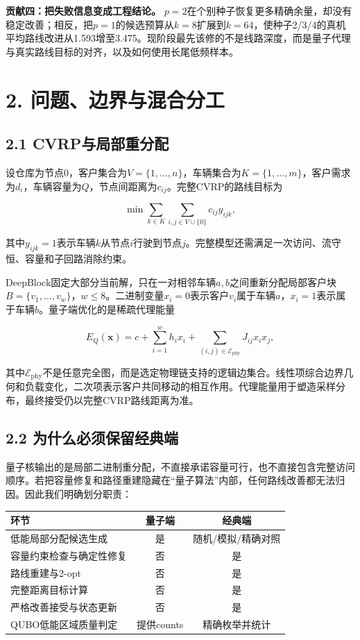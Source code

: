 \documentclass[
  10.5pt,
  UTF8]{ctexart}
\newcounter{none} %
\begin{document}
\textbf{贡献四：把失败信息变成工程结论。} \(p=2\)在个别种子恢复更多精确余量，却没有稳定改善；相反，把\(p=1\)的候选预算从\(k=8\)扩展到\(k=64\)，使种子2/3/4的真机平均路线改进从1.593增至3.475。现阶段最先该修的不是线路深度，而是量子代理与真实路线目标的对齐，以及如何使用长尾低频样本。

\section{2. 问题、边界与混合分工}\label{ux95eeux9898ux8fb9ux754cux4e0eux6df7ux5408ux5206ux5de5}

\subsection{2.1 CVRP与局部重分配}\label{cvrpux4e0eux5c40ux90e8ux91cdux5206ux914d}

设仓库为节点0，客户集合为\(V=\{1,\ldots,n\}\)，车辆集合为\(K=\{1,\ldots,m\}\)，客户需求为\(d_i\)，车辆容量为\(Q\)，节点间距离为\(c_{ij}\)。完整CVRP的路线目标为

\[
\min \sum_{k\in K}\sum_{i,j\in V\cup\{0\}} c_{ij}y_{ijk},
\]

其中\(y_{ijk}=1\)表示车辆\(k\)从节点\(i\)行驶到节点\(j\)。完整模型还需满足一次访问、流守恒、容量和子回路消除约束。

DeepBlock固定大部分当前解，只在一对相邻车辆\(a,b\)之间重新分配局部客户块\(B=\{v_1,\ldots,v_w\}\)，\(w\le 8\)。二进制变量\(x_i=0\)表示客户\(v_i\)属于车辆\(a\)，\(x_i=1\)表示属于车辆\(b\)。量子端优化的是稀疏代理能量

\[
E_Q(\mathbf{x})=c+\sum_{i=1}^{w}h_i x_i+\sum_{(i,j)\in\mathcal{E}_{\mathrm{phy}}}J_{ij}x_i x_j,
\]

其中\(\mathcal{E}_{\mathrm{phy}}\)不是任意完全图，而是选定物理链支持的逻辑边集合。线性项综合边界几何和负载变化，二次项表示客户共同移动的相互作用。代理能量用于塑造采样分布，最终接受仍以完整CVRP路线距离为准。

\subsection{2.2 为什么必须保留经典端}\label{ux4e3aux4ec0ux4e48ux5fc5ux987bux4fddux7559ux7ecfux5178ux7aef}

量子核输出的是局部二进制重分配，不直接承诺容量可行，也不直接包含完整访问顺序。若把容量修复和路径重建隐藏在``量子算法''内部，任何路线改善都无法归因。因此我们明确划分职责：

{\def\LTcaptype{none} %
\begin{longtable}[]{@{}lcc@{}}
\toprule\noalign{}
环节 & 量子端 & 经典端 \\
\midrule\noalign{}
\endhead
\bottomrule\noalign{}
\endlastfoot
低能局部分配候选生成 & 是 & 随机/模拟/精确对照 \\
容量约束检查与确定性修复 & 否 & 是 \\
路线重建与2-opt & 否 & 是 \\
完整距离目标计算 & 否 & 是 \\
严格改善接受与状态更新 & 否 & 是 \\
QUBO低能区域质量判定 & 提供counts & 精确枚举并统计 \\
\end{longtable}
}
\end{document}
